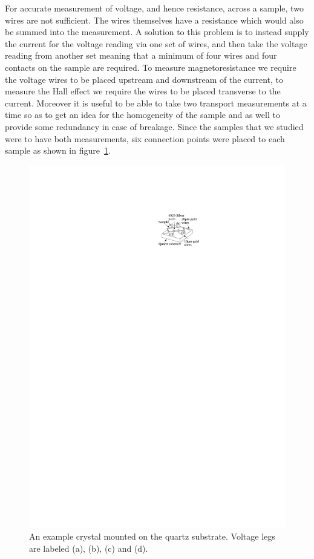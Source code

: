 For accurate measurement of voltage, and hence resistance, across a sample, two wires are not sufficient. The wires themselves have a resistance which would also be summed into the measurement. A solution to this problem is to instead supply the current for the voltage reading via one set of wires, and then take the voltage reading from another set meaning that a minimum of four wires and four contacts on the sample are required. To measure magnetoresistance we require the voltage wires to be placed upstream and downstream of the current, to measure the Hall effect we require the wires to be placed transverse to the current. Moreover it is useful to be able to take two transport measurements at a time so as to get an idea for the homogeneity of the sample and as well to provide some redundancy in case of breakage. Since the \BSCO samples that we studied were to have both measurements, six connection points were placed to each sample as shown in figure~\ref{Fig:Exp:BSCOSampleSchematic}.
\begin{figure}[htbp]
    \begin{center}
        \includegraphics[scale=0.9]{Chapter-ExperimentalTechnique/Figures/BSCOSampleSchematic/BSCOSampleSchematic}
        \caption{An example \BSCO crystal mounted on the quartz substrate. Voltage legs are labeled (a), (b), (c) and (d).}
        \label{Fig:Exp:BSCOSampleSchematic}
    \end{center}
\end{figure}
